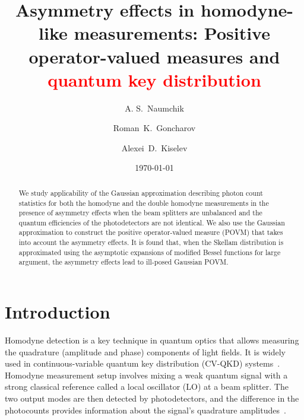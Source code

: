 \documentclass[%
reprint,
superscriptaddress,
 amsmath,amssymb,amsfonts,
 aps,
 pra,
 longbibliography
]{revtex4-2}
\begin{document}
\title{
  Asymmetry effects in homodyne-like measurements: Positive operator-valued measures and \textcolor{red}{quantum key distribution}
}

\author{A. S.~Naumchik}


\author{Roman~K.~Goncharov}


\author{Alexei~D.~Kiselev}

\date{\today}

\begin{abstract}
  We study applicability of
  the Gaussian approximation describing
  photon count statistics for both the homodyne and the double homodyne
  measurements in the presence of asymmetry effects when
  the beam splitters are unbalanced and the quantum efficiencies of
  the photodetectors are not identical.
We also use the Gaussian approximation to construct
the positive operator-valued measure (POVM) that takes into account the asymmetry effects. 
It is found that, when the Skellam distribution is approximated using the asymptotic expansions of
modified Bessel functions for large argument,
the asymmetry effects lead to ill-posed Gaussian POVM.
\end{abstract}
 
 \maketitle

\section{Introduction}
\label{sec:intro}

Homodyne detection is a key technique in quantum optics that allows measuring the quadrature (amplitude and phase) components of light fields. It is widely used in continuous-variable quantum key distribution (CV-QKD) systems~\cite{PhysRevLett.88.057902,PhysRevLett.93.170504,RevModPhys.84.621,e17096072,opt3040030,Zhang:apr:2024,Gaidash:pra:2024}. Homodyne measurement setup involves mixing a weak quantum signal with a strong classical reference called a local oscillator (LO) at a beam splitter. The two output modes are then detected by photodetectors, and the difference in the photocounts provides information about the signal’s quadrature amplitudes~\cite{Vogel:pra:1993,Kelley:pr:1964}.
\end{document}

